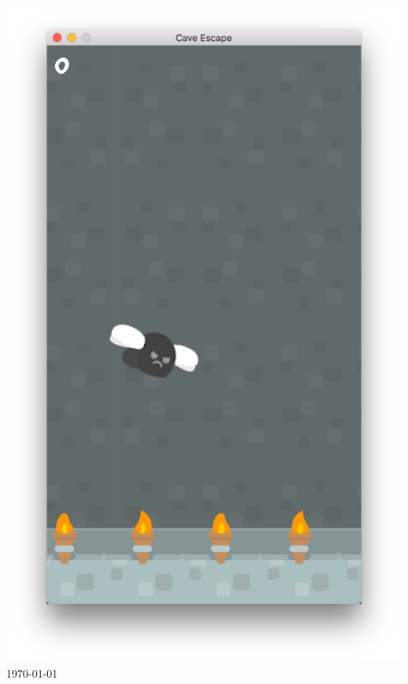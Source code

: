 \documentclass[12pt]{article}
\begin{document}
\begin{titlepage}
\includegraphics[scale=0.12]{FinalGame}\\

{\large \today}\\[3cm] %



\vfill %

\end{titlepage}
\end{document}
